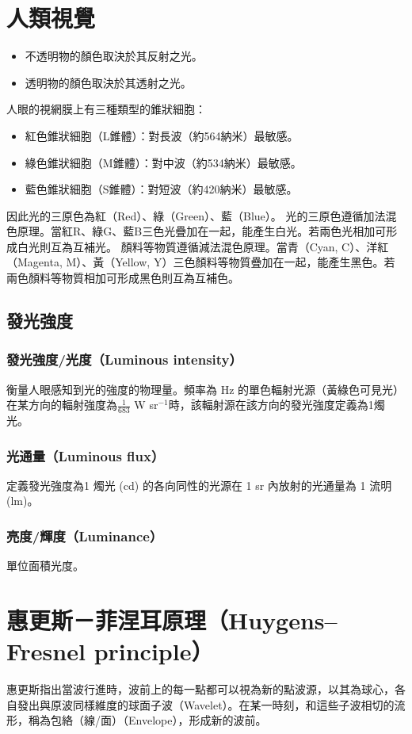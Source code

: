 \documentclass[a4paper,12pt]{report}
\begin{document}
\section{人類視覺}
\begin{itemize}
\item 不透明物的顏色取決於其反射之光。
\item 透明物的顏色取決於其透射之光。
\end{itemize}
人眼的視網膜上有三種類型的錐狀細胞：
\begin{itemize}
\item 紅色錐狀細胞（L錐體）：對長波（約564納米）最敏感。
\item 綠色錐狀細胞（M錐體）：對中波（約534納米）最敏感。
\item 藍色錐狀細胞（S錐體）：對短波（約420納米）最敏感。
\end{itemize}
因此光的三原色為紅（Red）、綠（Green）、藍（Blue）。
光的三原色遵循加法混色原理。當紅R、綠G、藍B三色光疊加在一起，能產生白光。若兩色光相加可形成白光則互為互補光。
顏料等物質遵循減法混色原理。當青（Cyan, C）、洋紅（Magenta, M）、黃（Yellow, Y）三色顏料等物質疊加在一起，能產生黑色。若兩色顏料等物質相加可形成黑色則互為互補色。
\subsection{發光強度}
\subsubsection{發光強度/光度（Luminous intensity）}
衡量人眼感知到光的強度的物理量。頻率為 Hz 的單色輻射光源（黃綠色可見光）在某方向的輻射強度為$\frac{1}{683}$ W sr$^{-1}$時，該輻射源在該方向的發光強度定義為1燭光。
\subsubsection{光通量（Luminous flux）}
定義發光強度為1 燭光 (cd) 的各向同性的光源在 1 sr 內放射的光通量為 1 流明 (lm)。
\subsubsection{亮度/輝度（Luminance）}
單位面積光度。


\section{惠更斯－菲涅耳原理（Huygens–Fresnel principle）}
惠更斯指出當波行進時，波前上的每一點都可以視為新的點波源，以其為球心，各自發出與原波同樣維度的球面子波（Wavelet）。在某一時刻，和這些子波相切的流形，稱為包絡（線/面）（Envelope），形成新的波前。
\end{document}
